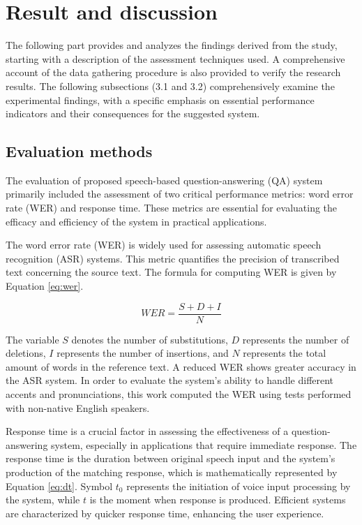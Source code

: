\documentclass{../styles/svproc}
\begin{document}
\section{Result and discussion}
The following part provides and analyzes the findings derived from the study, starting with a description of the assessment techniques used. A comprehensive account of the data gathering procedure is also provided to verify the research results. The following subsections (3.1 and 3.2) comprehensively examine the experimental findings, with a specific emphasis on essential performance indicators and their consequences for the suggested system.

\subsection{Evaluation methods}
The evaluation of proposed speech-based question-answering (QA) system primarily included the assessment of two critical performance metrics: word error rate (WER) and response time. These metrics are essential for evaluating the efficacy and efficiency of the system in practical applications.

The word error rate (WER) is widely used for assessing automatic speech recognition (ASR) systems. This metric quantifies the precision of transcribed text concerning the source text. The formula for computing WER is given by Equation \ref{eq:wer}.

\begin{equation}
	WER = \frac{S+D+I}{N}
	\label{eq:wer}
\end{equation}

The variable $S$ denotes the number of substitutions, $D$ represents the number of deletions, $I$ represents the number of insertions, and $N$ represents the total amount of words in the reference text. A reduced WER shows greater accuracy in the ASR system. In order to evaluate the system's ability to handle different accents and pronunciations, this work computed the WER using tests performed with non-native English speakers.

Response time is a crucial factor in assessing the effectiveness of a question-answering system, especially in applications that require immediate response. The response time is the duration between original speech input and the system's production of the matching response, which is mathematically represented by Equation \ref{eq:dt}. Symbol $t_0$ represents the initiation of voice input processing by the system, while $t$ is the moment when response is produced. Efficient systems are characterized by quicker response time, enhancing the user experience.
\end{document}
